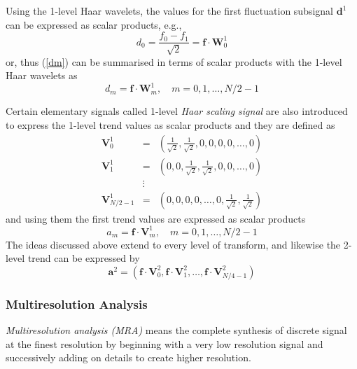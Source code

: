 \documentclass[a4paper,11pt]{article}
\begin{document}
Using the 1-level Haar wavelets, the values for the first fluctuation subsignal $\mathbf{d}^{1}$ can be expressed as scalar products, e.g.,
\begin{displaymath}
d_{0}=\frac{f_{0}-f_{1}}{\sqrt{2}}=\mathbf{f} \cdot \mathbf{W}_{0}^{1}
\end{displaymath}
or, thus (\ref{dm}) can be summarised in terms of scalar products with the 1-level Haar wavelets as
\begin{equation} \label{dm2}
d_{m} = \mathbf{f} \cdot \mathbf{W}_{m}^{1}, \quad m=0,1,\ldots,N/2-1
\end{equation}

Certain elementary signals called 1-level \emph{Haar scaling signal} are also introduced to express the 1-level trend values as scalar products and they are defined as
\begin{eqnarray}
\mathbf{V}_{0}^{1} & = &\left( \frac{1}{\sqrt{2}},\frac{1}{\sqrt{2}},0,0,0,0,\ldots,0 \right) \nonumber \\
\mathbf{V}_{1}^{1} & = & \left( 0,0,\frac{1}{\sqrt{2}},\frac{1}{\sqrt{2}},0,0,\ldots,0 \right) \nonumber \\
	 & \vdots & 	\nonumber \\
\mathbf{V}_{N/2-1}^{1} & = & \left( 0,0,0,0,\ldots,0,\frac{1}{\sqrt{2}},\frac{1}{\sqrt{2}} \right) 
\end{eqnarray}
and using them the first trend values are expressed as scalar products
\begin{equation} \label{am2}
a_{m} = \mathbf{f} \cdot \mathbf{V}_{m}^{1}, \quad m=0,1,\ldots,N/2-1
\end{equation}
The ideas discussed above extend to every level of transform, and likewise the 2-level trend can be expressed by
\begin{displaymath}
\mathbf{a}^{2} = \left( \mathbf{f}\cdot\mathbf{V}_{0}^{2},\mathbf{f}\cdot\mathbf{V}_{1}^{2},\ldots,\mathbf{f}\cdot\mathbf{V}_{N/4-1}^{2} \right)
\end{displaymath}

\subsubsection{Multiresolution Analysis}
\emph{Multiresolution analysis (MRA)} means the complete synthesis of discrete signal at the finest resolution by beginning with a very low resolution signal and successively adding on details to create higher resolution. \cite{walker}
\end{document}
